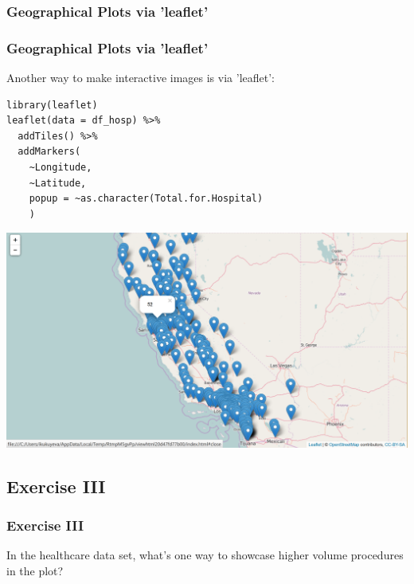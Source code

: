 \subsubsection{Geographical Plots via 'leaflet'}
\begin{frame}
	\frametitle{Geographical Plots via 'leaflet'}
Another way to make interactive images is via 'leaflet':

\begin{lstlisting}
library(leaflet)
leaflet(data = df_hosp) %>% 
  addTiles() %>%
  addMarkers(
    ~Longitude, 
    ~Latitude, 
    popup = ~as.character(Total.for.Hospital)
    )
\end{lstlisting}

\newpage
  \begin{center}
		\includegraphics[scale=0.37]{images/leaflet.png}
	\end{center}
\end{frame}

\subsection{Exercise III}
\begin{frame}
	\frametitle{Exercise III}
	In the healthcare data set, what's one way to showcase higher volume procedures in the plot?  
\end{frame}
